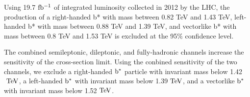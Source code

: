 Using 19.7$~\mathrm{fb^{-1}}$ of integrated luminosity collected in 2012 by the
LHC, the production of a right-handed b* with mass between 0.82 TeV and 1.43 TeV, 
left-handed b* with mass between 0.88 TeV and 1.39 TeV, 
and vectorlike b* with mass between 0.8 TeV and 1.53 TeV is excluded at the 95\% confidence level.

The combined semileptonic, dileptonic, and fully-hadronic channels increase the sensitivity of the cross-section limit.  
Using the conbined sensitivity of the two channels, we exclude a right-handed $\mathrm{b}^{*}$ particle with invariant mass below 1.42$~\mathrm{TeV}$, 
a left-handed $\mathrm{b}^{*}$ with invariant mass below 1.39$~\mathrm{TeV}$, and a vectorlike $\mathrm{b}^{*}$ with invariant mass below 1.52$~\mathrm{TeV}$.

